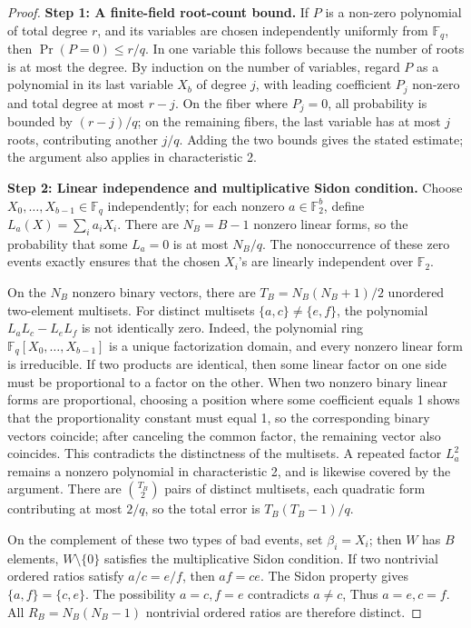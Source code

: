 \documentclass[a4paper,11pt]{article}
\theoremstyle{remark}
\begin{document}
\begin{proof}
\textbf{Step 1: A finite-field root-count bound.}
If $P$ is a non-zero polynomial of total degree $r$, and its variables are chosen independently uniformly from $\mathbb F_q$,
then $\Pr(P=0)\le r/q$. In one variable this follows because the number of roots is at most the degree.
By induction on the number of variables, regard $P$ as a polynomial in its last variable $X_b$ of degree $j$, with leading coefficient
$P_j$ non-zero and total degree at most $r - j$. On the fiber where $P_j = 0$, all probability is bounded by
$(r-j)/q$; on the remaining fibers, the last variable has at most $j$ roots, contributing another $j/q$.
Adding the two bounds gives the stated estimate; the argument also applies in characteristic 2.

\textbf{Step 2: Linear independence and multiplicative Sidon condition.}
Choose $X_0,\ldots,X_{b-1}\in\mathbb F_q$ independently; for each nonzero
$a\in\mathbb F_2^b$, define $L_a(X)=\sum_i a_iX_i$.
There are $N_B=B-1$ nonzero linear forms, so the probability that some $L_a=0$ is at most $N_B/q$.
The nonoccurrence of these zero events exactly ensures that the chosen $X_i$'s are linearly independent over $\mathbb F_2$.

On the $N_B$ nonzero binary vectors, there are
$T_B=N_B(N_B+1)/2$ unordered two-element multisets. For distinct multisets $\{a,c\}\ne\{e,f\}$,
the polynomial $L_aL_c-L_eL_f$ is not identically zero. Indeed, the polynomial ring
$\mathbb F_q[X_0,\ldots,X_{b-1}]$ is a unique factorization domain, and every nonzero linear form
is irreducible. If two products are identical, then some linear factor on one side must be proportional to a factor on the other.
When two nonzero binary linear forms are proportional, choosing a position where some coefficient equals 1 shows that the proportionality constant must equal 1,
so the corresponding binary vectors coincide; after canceling the common factor, the remaining vector also coincides.
This contradicts the distinctness of the multisets. A repeated factor $L_a^2$ remains a nonzero polynomial in characteristic 2,
and is likewise covered by the argument.
There are $\binom{T_B}{2}$ pairs of distinct multisets, each quadratic form contributing at most $2/q$, so the total error is
$T_B(T_B-1)/q$.

On the complement of these two types of bad events, set $\beta_i=X_i$; then $W$ has $B$ elements,
$W\setminus\{0\}$ satisfies the multiplicative Sidon condition.
If two nontrivial ordered ratios satisfy $a/c=e/f$, then $af=ce$.
The Sidon property gives $\{a,f\}=\{c,e\}$. The possibility $a=c,f=e$ contradicts $a\ne c$,
Thus $a=e,c=f$. All $R_B=N_B(N_B-1)$ nontrivial ordered ratios are therefore distinct.


\end{proof}
\end{document}
